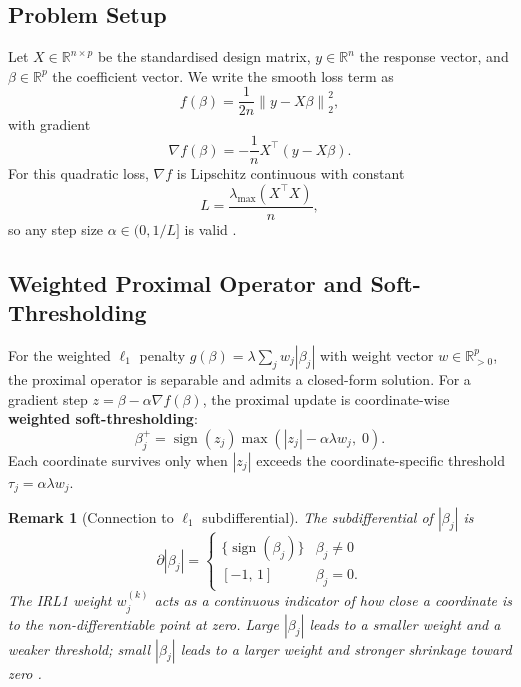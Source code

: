 \documentclass[12pt,a4paper]{article}
\DeclareMathOperator{\sign}{sign}
\newcommand{\R}{\mathbb{R}}
\newcommand{\norm}[1]{\left\|#1\right\|}
\newcommand{\abs}[1]{\left|#1\right|}
\newtheorem{remark}{Remark}
\begin{document}
\subsection{Problem Setup}

Let $X \in \R^{n \times p}$ be the standardised design matrix, $y \in \R^n$ the
response vector, and $\beta \in \R^p$ the coefficient vector.  We write the smooth
loss term as
\begin{equation}
    f(\beta) = \frac{1}{2n}\norm{y - X\beta}_2^2,
    \label{eq:smooth}
\end{equation}
with gradient
\begin{equation}
    \nabla f(\beta) = -\frac{1}{n}X^\top(y - X\beta).
    \label{eq:gradient}
\end{equation}
For this quadratic loss, $\nabla f$ is Lipschitz continuous with constant
\begin{equation}
    L = \frac{\lambda_{\max}(X^\top X)}{n},
    \label{eq:lipschitz}
\end{equation}
so any step size $\alpha \in (0, 1/L]$ is valid \citep{parikh2014}.

\subsection{Weighted Proximal Operator and Soft-Thresholding}

For the weighted $\ell_1$ penalty $g(\beta) = \lambda \sum_j w_j \abs{\beta_j}$ with
weight vector $w \in \R^p_{>0}$, the proximal operator is separable and admits a
closed-form solution.  For a gradient step $z = \beta - \alpha \nabla f(\beta)$, the
proximal update is coordinate-wise \textbf{weighted soft-thresholding}:
\begin{equation}
    \beta_j^{+} = \sign(z_j)\max\!\left(\abs{z_j} - \alpha \lambda w_j,\; 0\right).
    \label{eq:wst}
\end{equation}
Each coordinate survives only when $\abs{z_j}$ exceeds the
coordinate-specific threshold $\tau_j = \alpha \lambda w_j$.

\begin{remark}[Connection to $\ell_1$ subdifferential]
The subdifferential of $\abs{\beta_j}$ is
\begin{equation}
    \partial \abs{\beta_j} =
    \begin{cases}
        \{\sign(\beta_j)\} & \beta_j \neq 0 \\
        [-1,\, 1]           & \beta_j = 0.
    \end{cases}
    \label{eq:subdiff}
\end{equation}
The IRL1 weight $w_j^{(k)}$ acts as a continuous indicator of how close a coordinate
is to the non-differentiable point at zero.  Large $\abs{\beta_j}$ leads to a smaller
weight and a weaker threshold; small $\abs{\beta_j}$ leads to a larger weight and
stronger shrinkage toward zero \citep{candes2008}.
\end{remark}
\end{document}
